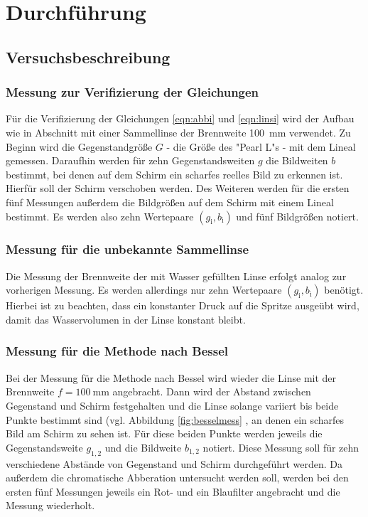 \section{Durchführung}
\label{sec:Durchführung}



\subsection{Versuchsbeschreibung}
\label{sec:Versuchsbeschreibung}


\subsubsection{Messung zur Verifizierung der Gleichungen}

Für die Verifizierung der Gleichungen \eqref{eqn:abbi} und \eqref{eqn:linsi} wird der 
Aufbau wie in Abschnitt \label{sec:gundb} mit einer Sammellinse der Brennweite 
\SI{100}{\milli\meter} verwendet. 
Zu Beginn wird die Gegenstandgröße $G$ - die Größe des "Pearl L"s - mit dem Lineal gemessen.
Daraufhin werden für zehn Gegenstandsweiten $g$ die Bildweiten $b$ bestimmt, bei denen auf dem
Schirm ein scharfes reelles Bild zu erkennen ist. Hierfür soll der Schirm verschoben werden.
Des Weiteren werden für die ersten fünf Messungen außerdem die Bildgrößen auf dem Schirm mit 
einem Lineal bestimmt. Es werden also zehn Wertepaare $(g_{\mathrm{i}},b_{\mathrm{i}})$ und
fünf Bildgrößen notiert.

\subsubsection{Messung für die unbekannte Sammellinse}

Die Messung der Brennweite der mit Wasser gefüllten Linse erfolgt analog zur vorherigen 
Messung. Es werden allerdings nur zehn Wertepaare $(g_{\mathrm{i}},b_{\mathrm{i}})$ 
benötigt. Hierbei ist zu beachten, dass ein konstanter Druck auf die Spritze ausgeübt wird, 
damit das Wasservolumen in der Linse konstant bleibt.

\subsubsection{Messung für die Methode nach Bessel}

Bei der Messung für die Methode nach Bessel wird wieder die Linse mit der Brennweite 
$f=\SI{100}{\milli\meter}$ angebracht.
Dann wird der Abstand zwischen Gegenstand und Schirm festgehalten und die Linse solange variiert
bis beide Punkte bestimmt sind (vgl. Abbildung \ref{fig:besselmess} , an denen ein scharfes Bild am Schirm zu sehen ist.
Für diese beiden Punkte werden jeweils die Gegenstandsweite $g_{1,2}$ und die Bildweite
$b_{1,2}$ notiert. Diese Messung soll für zehn verschiedene Abstände von Gegenstand und Schirm 
durchgeführt werden.
Da außerdem die chromatische Abberation untersucht werden soll, werden bei den ersten fünf 
Messungen jeweils ein Rot- und ein Blaufilter angebracht und die Messung wiederholt.

